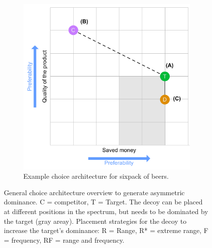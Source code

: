 \begin{figure}[t]
\begin{subfigure}[t]{0.49\textwidth}
	\end{subfigure}
	\begin{subfigure}[t]{0.49\textwidth}
		\includegraphics[width=\textwidth]{figures/decoy/decoy-dimensions-beer}
		\caption{Example choice architecture for sixpack of beers.}
		\label{fig:decoy:beer-construction} 
	\end{subfigure}
	\caption{
		General choice architecture overview to generate asymmetric dominance. 
		C = competitor, T = Target. The decoy can be placed at different positions in the spectrum, but needs to be dominated by the target (gray areay). Placement strategies for the decoy to increase the target's dominance: R = Range, R* = extreme range, F = frequency, RF = range and frequency.
	} 
\end{figure}


